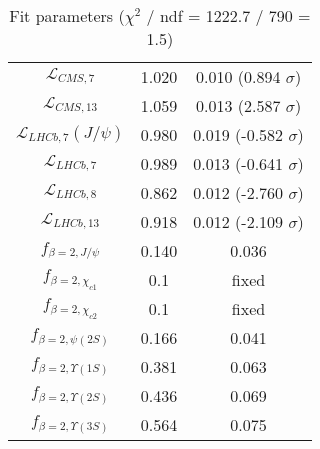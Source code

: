 \begin{table}[h!]
\begin{tabular}{c|c|c}
$\mathcal L_{CMS,7}$ & 1.020 & 0.010 (0.894 $\sigma$) \\
$\mathcal L_{CMS,13}$ & 1.059 & 0.013 (2.587 $\sigma$) \\
$\mathcal L_{LHCb,7}(J/\psi)$ & 0.980 & 0.019 (-0.582 $\sigma$) \\
$\mathcal L_{LHCb,7}$ & 0.989 & 0.013 (-0.641 $\sigma$) \\
$\mathcal L_{LHCb,8}$ & 0.862 & 0.012 (-2.760 $\sigma$) \\
$\mathcal L_{LHCb,13}$ & 0.918 & 0.012 (-2.109 $\sigma$) \\
$f_{\beta=2,J/\psi}$ & 0.140 & 0.036 \\
$f_{\beta=2,\chi_{c1}}$ & 0.1 & fixed \\
$f_{\beta=2,\chi_{c2}}$ & 0.1 & fixed \\
$f_{\beta=2,\psi(2S)}$ & 0.166 & 0.041 \\
$f_{\beta=2,\Upsilon(1S)}$ & 0.381 & 0.063 \\
$f_{\beta=2,\Upsilon(2S)}$ & 0.436 & 0.069 \\
$f_{\beta=2,\Upsilon(3S)}$ & 0.564 & 0.075 \\
\end{tabular}
\caption{Fit parameters ($\chi^2$ / ndf = 1222.7 / 790 = 1.5)}
\end{table}
